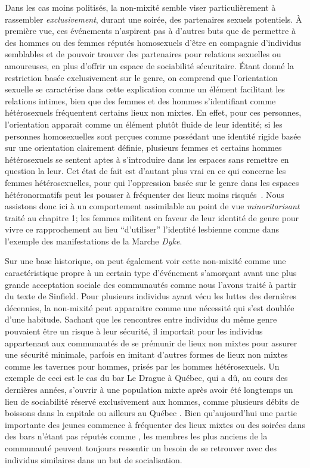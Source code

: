 Dans les cas moins politisés, la non-mixité semble viser particulièrement à rassembler \emph{exclusivement}, durant une soirée, des partenaires sexuels potentiels.
À première vue, ces événements n'aspirent pas à d'autres buts que de permettre à des hommes ou des femmes réputés homosexuels d'être en compagnie d'individus semblables et de pouvoir trouver des partenaires pour relations sexuelles ou amoureuses, en plus d'offrir un espace de sociabilité sécuritaire.
Étant donné la restriction basée exclusivement sur le genre, on comprend que l'orientation sexuelle se caractérise dans cette explication comme un élément facilitant les relations intimes, bien que des femmes et des hommes s'identifiant comme hétérosexuels fréquentent certains lieux non mixtes.
En effet, pour ces personnes, l'orientation apparait comme un élément plutôt fluide de leur identité; si les personnes homosexuelles sont perçues comme possédant une identité rigide basée sur une orientation clairement définie, plusieurs femmes et certains hommes hétérosexuels se sentent aptes à s'introduire dans les espaces \lgbt{} sans remettre en question la leur.
Cet état de fait est d'autant plus vrai en ce qui concerne les femmes hétérosexuelles, pour qui l'oppression basée sur le genre dans les espaces hétéronormatifs peut les pousser à fréquenter \lgbt{} des lieux moins risqués~\citep[][9]{Bettani2014}.
Nous assistons donc ici à un comportement assimilable au point de vue \emph{minoritarisant} traité au chapitre 1; les femmes militent en faveur de leur identité de genre pour vivre ce rapprochement au lieu \enquote{d'utiliser} l'identité lesbienne comme dans l'exemple des manifestations de la Marche \emph{Dyke}.

Sur une base historique, on peut également voir cette non-mixité comme une caractéristique propre à un certain type d'événement s'amorçant avant une plus grande acceptation sociale des communautés \lgbt{} comme nous l'avons traité à partir du texte de Sinfield.
Pour plusieurs individus \lgbt{} ayant vécu les luttes \lgbt{} des dernières décennies, la non-mixité peut apparaitre comme une nécessité qui s'est doublée d'une habitude.
Sachant que les rencontres entre individus du même genre pouvaient être un risque à leur sécurité, il importait pour les individus appartenant aux  communautés \lgbt{} de se prémunir de lieux non mixtes pour assurer une sécurité minimale, parfois en imitant d'autres formes de lieux non mixtes comme les tavernes pour hommes, prisés par les hommes hétérosexuels.
Un exemple de ceci est le cas du bar Le Drague à Québec, qui a dû, au cours des dernières années, s'ouvrir à une population mixte après avoir été longtemps un lieu de sociabilité réservé exclusivement aux hommes, comme plusieurs débits de boissons dans la capitale ou ailleurs au Québec \missref{}.
Bien qu'aujourd'hui une partie importante des jeunes \lgbt{} commence à fréquenter des lieux mixtes ou des soirées dans des bars n'étant pas réputés comme \lgbt{}, les membres les plus anciens de la communauté peuvent toujours ressentir un besoin de se retrouver avec des individus similaires dans un but de socialisation.

